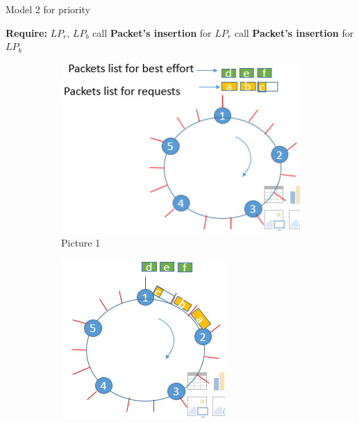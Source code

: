 \documentclass{article}
\begin{document}
\begin{algorithm}
\caption{Model 2 for priority }
\begin{algorithmic}
\State \textbf{Require:}  $LP_{r}$, $LP_{b}$
\State call \textbf{ Packet's insertion} for $LP_{r}$
\EndWhile
\State call \textbf{ Packet's insertion} for $LP_{b}$
\end{algorithmic}
\end{algorithm}
\newpage
\begin{figure}
  \begin{subfigure}[b]{0.3\textwidth}
    \includegraphics[width=\textwidth]{model21.png}
    \caption{Picture 1}
    \label{fig:1}
  \end{subfigure}
  \begin{subfigure}[b]{0.3\textwidth}
    \includegraphics[width=\textwidth]{model22.png}

\end{subfigure}
\end{figure}
\end{document}

